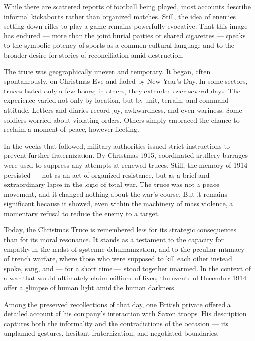 While there are scattered reports of football being played, most accounts describe informal kickabouts rather than organized matches. Still, the idea of enemies setting down rifles to play a game remains powerfully evocative. That this image has endured — more than the joint burial parties or shared cigarettes — speaks to the symbolic potency of sports as a common cultural language and to the broader desire for stories of reconciliation amid destruction.

The truce was geographically uneven and temporary. It began, often spontaneously, on Christmas Eve and faded by New Year’s Day. In some sectors, truces lasted only a few hours; in others, they extended over several days. The experience varied not only by location, but by unit, terrain, and command attitude. Letters and diaries record joy, awkwardness, and even wariness. Some soldiers worried about violating orders. Others simply embraced the chance to reclaim a moment of peace, however fleeting.

In the weeks that followed, military authorities issued strict instructions to prevent further fraternization. By Christmas 1915, coordinated artillery barrages were used to suppress any attempts at renewed truces. Still, the memory of 1914 persisted — not as an act of organized resistance, but as a brief and extraordinary lapse in the logic of total war. The truce was not a peace movement, and it changed nothing about the war’s course. But it remains significant because it showed, even within the machinery of mass violence, a momentary refusal to reduce the enemy to a target.

Today, the Christmas Truce is remembered less for its strategic consequences than for its moral resonance. It stands as a testament to the capacity for empathy in the midst of systemic dehumanization, and to the peculiar intimacy of trench warfare, where those who were supposed to kill each other instead spoke, sang, and — for a short time — stood together unarmed. In the context of a war that would ultimately claim millions of lives, the events of December 1914 offer a glimpse of human light amid the human darkness.

Among the preserved recollections of that day, one British private offered a detailed account of his company’s interaction with Saxon troops. His description captures both the informality and the contradictions of the occasion — its unplanned gestures, hesitant fraternization, and negotiated boundaries.

\vspace{0.5em}

